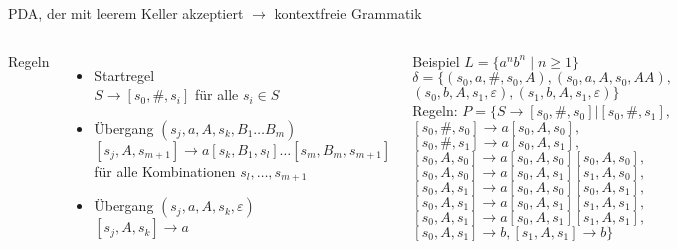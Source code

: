 
\begin{frame}{PDA, der mit leerem Keller akzeptiert $\rightarrow$ kontextfreie Grammatik}
	\label{Grammatik_aus_PDA}
	\begin{columns}
		Regeln
		\begin{itemize}
			\item Startregel\\
			$S\rightarrow [s_0, \#, s_i]$ für alle $s_i \in S$
			\item Übergang $(s_j,a,A,s_k,B_1\ldots B_m)$\\
			$[s_j,A,s_{m+1}] \rightarrow a[s_k,B_1,s_l]\ldots[s_m,B_m,s_{m+1}]$ für alle Kombinationen $s_l,\ldots,s_{m+1}$
			\item Übergang $(s_j,a,A,s_k,\varepsilon)$\\
			$[s_j,A,s_k]\rightarrow a$
		\end{itemize}
		Beispiel $L=\{a^nb^n \mid n \geq 1\}$\\
		 $\delta=\{(s_0,a,\#,s_0,A),(s_0,a,A,s_0,AA),$\\
		 \qquad$(s_0,b,A,s_1,\varepsilon),(s_1,b,A,s_1,\varepsilon)\}$\\
		 \vspace{0.5em}
		Regeln: $P=\{S \rightarrow [s_0,\#,s_0]|[s_0,\#,s_1],$\\
			$[s_0,\#,s_0]\rightarrow a[s_0,A,s_0],$\\
			$[s_0,\#,s_1]\rightarrow a[s_0,A,s_1],$\\
			$[s_0,A,s_0]\rightarrow a[s_0,A,s_0][s_0,A,s_0],$\\
			$[s_0,A,s_0]\rightarrow a[s_0,A,s_1][s_1,A,s_0],$\\
			$[s_0,A,s_1]\rightarrow a[s_0,A,s_0][s_0,A,s_1],$\\
			$[s_0,A,s_1]\rightarrow a[s_0,A,s_1][s_1,A,s_1],$\\
			$[s_0,A,s_1]\rightarrow a[s_0,A,s_1][s_1,A,s_1],$\\
			$[s_0,A,s_1]\rightarrow b, [s_1,A,s_1]\rightarrow b\}$
	\end{columns}
\end{frame}

